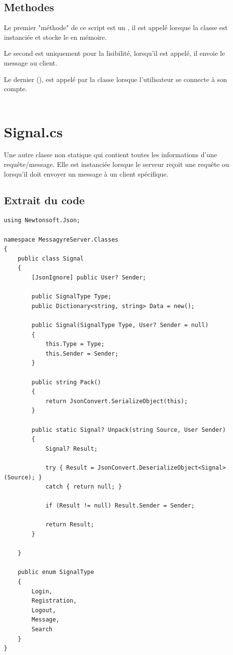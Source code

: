 \documentclass[12pt]{report}
\begin{document}
\subsection{Methodes}
Le premier "méthode" de ce script est un , il est appelé lorsque la classe est instanciée et stocke le  en mémoire.

Le second est uniquement pour la lisibilité, lorsqu'il est appelé, il envoie le message  au client.

Le dernier (), est appelé par la classe  lorsque l'utilisateur se connecte à son compte.
\\\\

\section{Signal.cs}

Une autre classe non statique qui contient toutes les informations d'une requête/message. Elle est instanciée lorsque le serveur reçoit une requête ou lorsqu'il doit envoyer un message à un client spécifique.

\subsection{Extrait du code}

\begin{verbatim}
using Newtonsoft.Json;

namespace MessagyreServer.Classes
{
	public class Signal
	{
		[JsonIgnore] public User? Sender;

		public SignalType Type;
		public Dictionary<string, string> Data = new();

		public Signal(SignalType Type, User? Sender = null)
		{
			this.Type = Type;
			this.Sender = Sender;
		}

		public string Pack()
		{
			return JsonConvert.SerializeObject(this);
		}
			
		public static Signal? Unpack(string Source, User Sender)
		{
			Signal? Result;

			try { Result = JsonConvert.DeserializeObject<Signal>(Source); }
			catch { return null; }

			if (Result != null) Result.Sender = Sender;

			return Result;
		}
		
	}

	public enum SignalType
	{
		Login, 
		Registration, 
		Logout,
		Message,
		Search
	}
}
\end{verbatim}
\end{document}
